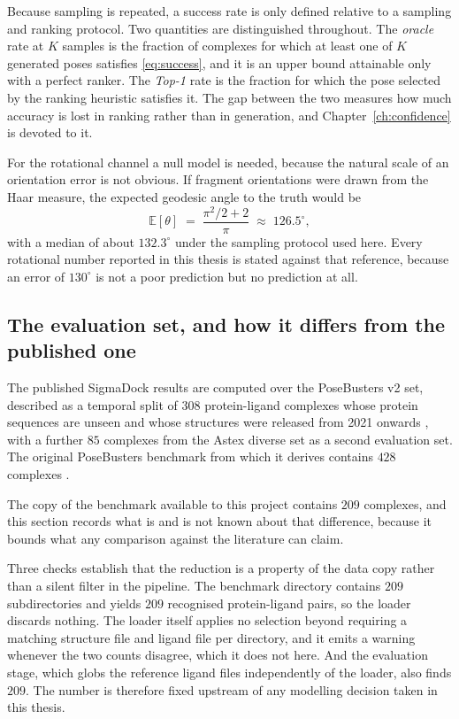 \documentclass[11pt,a4paper]{report}
\theoremstyle{plain}
\theoremstyle{definition}
\theoremstyle{remark}
\newcommand{\E}{\mathbb{E}}
\newcommand{\Ang}[1]{\ensuremath{#1^{\circ}}}
\begin{document}
Because sampling is repeated, a success rate is only defined relative to a
sampling and ranking protocol. Two quantities are distinguished throughout.
The \emph{oracle} rate at $K$ samples is the fraction of complexes for which at
least one of $K$ generated poses satisfies \eqref{eq:success}, and it is an
upper bound attainable only with a perfect ranker. The \emph{Top-1} rate is the
fraction for which the pose selected by the ranking heuristic satisfies it.
The gap between the two measures how much accuracy is lost in ranking rather
than in generation, and Chapter~\ref{ch:confidence} is devoted to it.

For the rotational channel a null model is needed, because the natural scale of
an orientation error is not obvious. If fragment orientations were drawn from
the Haar measure, the expected geodesic angle to the truth would be
\begin{equation}
  \E[\theta] \;=\; \frac{\pi^{2}/2 + 2}{\pi} \;\approx\; \Ang{126.5},
  \label{eq:haar-null}
\end{equation}
with a median of about $\Ang{132.3}$ under the sampling protocol used here.
Every rotational number reported in this thesis is stated against that
reference, because an error of $\Ang{130}$ is not a poor prediction but no
prediction at all.

\subsection{The evaluation set, and how it differs from the published one}
\label{sec:evaluation-set}

The published SigmaDock results are computed over the PoseBusters v2 set,
described as a temporal split of $308$ protein-ligand complexes whose protein
sequences are unseen and whose structures were released from 2021 onwards
\citep{prat2026sigmadock}, with a further $85$ complexes from the Astex diverse
set \citep{hartshorn2007astex} as a second evaluation set. The original
PoseBusters benchmark from which it derives contains $428$ complexes
\citep{buttenschoen2024posebusters}.

The copy of the benchmark available to this project contains $209$ complexes,
and this section records what is and is not known about that difference,
because it bounds what any comparison against the literature can claim.

Three checks establish that the reduction is a property of the data copy rather
than a silent filter in the pipeline. The benchmark directory contains $209$
subdirectories and yields $209$ recognised protein-ligand pairs, so the loader
discards nothing. The loader itself applies no selection beyond requiring a
matching structure file and ligand file per directory, and it emits a warning
whenever the two counts disagree, which it does not here. And the evaluation
stage, which globs the reference ligand files independently of the loader, also
finds $209$. The number is therefore fixed upstream of any modelling decision
taken in this thesis.
\end{document}

